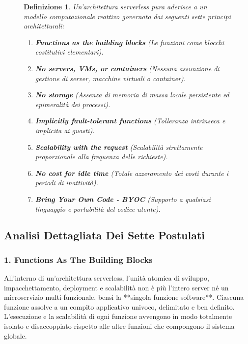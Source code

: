 \documentclass[11pt, a4paper]{article}
\newtheorem{theorem}{Definizione}
\begin{document}
\begin{figure}[H]
\centering
\begin{minipage}{0.95\textwidth}
\begin{theorem}
Un'architettura serverless pura aderisce a un modello computazionale reattivo governato dai seguenti sette principi architetturali:
\begin{enumerate}[label=\textbf{\arabic*.}]
    \item \textbf{Functions as the building blocks} (Le funzioni come blocchi costitutivi elementari).
    \item \textbf{No servers, VMs, or containers} (Nessuna assunzione di gestione di server, macchine virtuali o container).
    \item \textbf{No storage} (Assenza di memoria di massa locale persistente ed epimeralità dei processi).
    \item \textbf{Implicitly fault-tolerant functions} (Tolleranza intrinseca e implicita ai guasti).
    \item \textbf{Scalability with the request} (Scalabilità strettamente proporzionale alla frequenza delle richieste).
    \item \textbf{No cost for idle time} (Totale azzeramento dei costi durante i periodi di inattività).
    \item \textbf{Bring Your Own Code - BYOC} (Supporto a qualsiasi linguaggio e portabilità del codice utente).
\end{enumerate}
\end{theorem}
\end{minipage}
\end{figure}

\subsection{Analisi Dettagliata Dei Sette Postulati}

\subsubsection{1. Functions As The Building Blocks}
All'interno di un'architettura serverless, l'unità atomica di sviluppo, impacchettamento, deployment e scalabilità non è più l'intero server né un microservizio multi-funzionale, bensì la **singola funzione software**. Ciascuna funzione assolve a un compito applicativo univoco, delimitato e ben definito. L'esecuzione e la scalabilità di ogni funzione avvengono in modo totalmente isolato e disaccoppiato rispetto alle altre funzioni che compongono il sistema globale.
\end{document}
